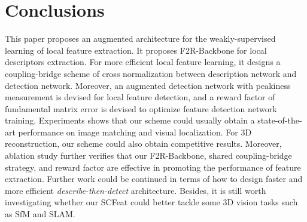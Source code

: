\documentclass[journal]{IEEEtran}
\begin{document}
\section{Conclusions}
This paper proposes an augmented architecture for the weakly-supervised learning of local feature extraction. It proposes F2R-Backbone for local descriptors extraction. For more efficient local feature learning, it designs a coupling-bridge scheme of cross normalization between description network and detection network.
Moreover, an augmented detection network with peakiness measurement is devised for local feature detection, and a reward factor of fundamental matrix error is devised to optimize feature detection network training. Experiments shows that our scheme could usually obtain a state-of-the-art performance on image matching and visual localization. For 3D reconstruction, our scheme could also obtain competitive results. Moreover, ablation study further verifies that our F2R-Backbone, shared coupling-bridge strategy, and reward factor are effective in promoting the performance of feature extraction. Further work could be continued in terms of how to design faster and more efficient \emph{describe-then-detect} architecture. Besides, it is still worth investigating whether our SCFeat could better tackle some 3D vision tasks such as SfM and SLAM.


































































































\vfill
\end{document}
